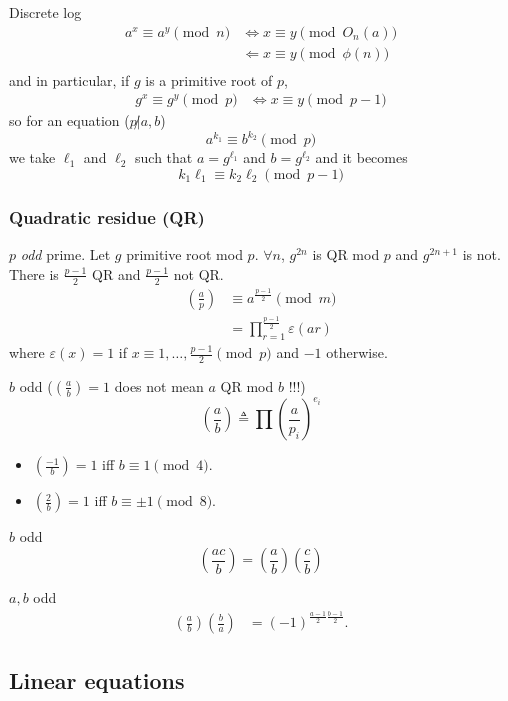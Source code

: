 Discrete log
\begin{align*}
  a^x \equiv a^y \pmod{n} & \Leftrightarrow x \equiv y \pmod{O_n(a)}\\
                          & \Leftarrow x \equiv y \pmod{\phi(n)}\\
\end{align*}
and in particular, if $g$ is a primitive root of $p$,
\begin{align*}
  g^x \equiv g^y \pmod{p} & \Leftrightarrow x \equiv y \pmod{p-1}
\end{align*}
so for an equation ($p \not| a,b$)
\[ a^{k_1} \equiv b^{k_2} \pmod{p} \]
we take $\ell_1$ and $\ell_2$ such that $a = g^{\ell_1}$ and $b = g^{\ell_2}$
and it becomes
\[ k_1\ell_1 \equiv k_2\ell_2 \pmod{p-1} \]


\subsubsection{Quadratic residue (QR)}
$p$ \emph{odd} prime.
Let $g$ primitive root mod $p$.
$\forall n$, $g^{2n}$ is QR mod $p$ and $g^{2n+1}$ is not.
There is $\frac{p-1}{2}$ QR and $\frac{p-1}{2}$ not QR.
\begin{align*}
  \left(\frac{a}{p}\right) & \equiv a^{\frac{p-1}{2}} \pmod{m}\\
                           & = \prod_{r=1}^{\frac{p-1}{2}} \varepsilon(ar)
\end{align*}
where $\varepsilon(x) = 1$ if $x \equiv 1, \ldots, \frac{p-1}{2} \pmod{p}$ and $-1$ otherwise.

$b$ odd ($\left(\frac{a}{b}\right)=1$ does not mean $a$ QR mod $b$ !!!)
\[ \left(\frac{a}{b}\right) \triangleq \prod \left(\frac{a}{p_i}\right)^{e_i} \]
\begin{itemize}
  \item $\left(\frac{-1}{b}\right) = 1$ iff $b \equiv 1 \pmod{4}$.
  \item $\left(\frac{2}{b}\right) = 1$ iff $b \equiv \pm 1 \pmod{8}$.
\end{itemize}

$b$ odd
\[ \left(\frac{ac}{b}\right) = \left(\frac{a}{b}\right)\left(\frac{c}{b}\right) \]

$a,b$ odd
\begin{align*}
  \left(\frac{a}{b}\right)\left(\frac{b}{a}\right) & = (-1)^{\frac{a-1}{2}\frac{b-1}{2}}.
\end{align*}



\subsection{Linear equations}

